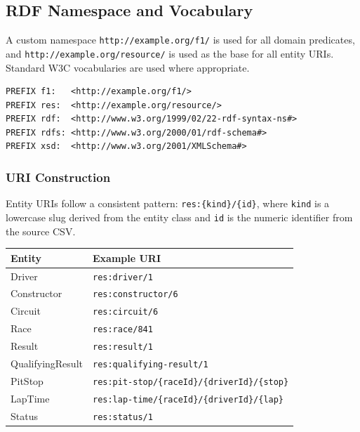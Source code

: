 \documentclass[12pt,a4paper]{article}
\begin{document}
\subsection{RDF Namespace and Vocabulary}

A custom namespace \texttt{http://example.org/f1/} is used for all domain
predicates, and \texttt{http://example.org/resource/} is used as the base for
all entity URIs. Standard W3C vocabularies are used where appropriate.

\begin{lstlisting}[style=sparql, caption={SPARQL namespace prefixes used throughout the application}]
PREFIX f1:   <http://example.org/f1/>
PREFIX res:  <http://example.org/resource/>
PREFIX rdf:  <http://www.w3.org/1999/02/22-rdf-syntax-ns#>
PREFIX rdfs: <http://www.w3.org/2000/01/rdf-schema#>
PREFIX xsd:  <http://www.w3.org/2001/XMLSchema#>
\end{lstlisting}

\subsubsection{URI Construction}

Entity URIs follow a consistent pattern:
\texttt{res:\{kind\}/\{id\}}, where \texttt{kind} is a lowercase slug derived
from the entity class and \texttt{id} is the numeric identifier from the source
CSV.

\begin{center}
\begin{tabular}{@{}ll@{}}
\toprule
\textbf{Entity}    & \textbf{Example URI} \\
\midrule
Driver             & \texttt{res:driver/1} \\
Constructor        & \texttt{res:constructor/6} \\
Circuit            & \texttt{res:circuit/6} \\
Race               & \texttt{res:race/841} \\
Result             & \texttt{res:result/1} \\
QualifyingResult   & \texttt{res:qualifying-result/1} \\
PitStop            & \texttt{res:pit-stop/\{raceId\}/\{driverId\}/\{stop\}} \\
LapTime            & \texttt{res:lap-time/\{raceId\}/\{driverId\}/\{lap\}} \\
Status             & \texttt{res:status/1} \\
\bottomrule
\end{tabular}
\end{center}
\end{document}

